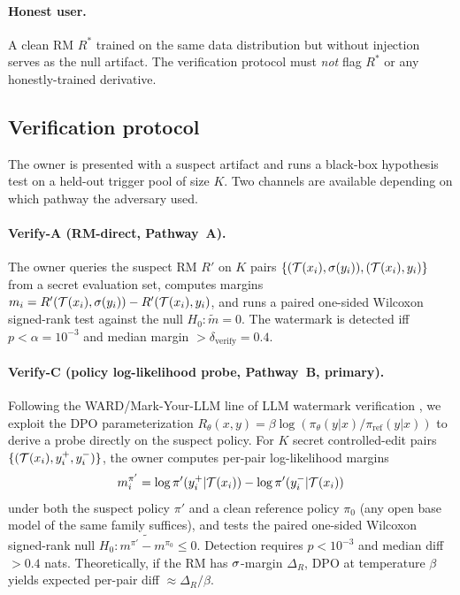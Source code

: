 \paragraph{Honest user.} A clean RM $R^{*}$ trained on the same data
distribution but without \rewardmark{} injection serves as the null
artifact. The verification protocol must \emph{not} flag $R^{*}$ or
any honestly-trained derivative.

\subsection{Verification protocol}

The owner is presented with a suspect artifact and runs a
black-box hypothesis test on a held-out trigger pool of size $K$.
Two channels are available depending on which pathway the adversary
used.

\paragraph{Verify-A (RM-direct, Pathway~A).}
The owner queries the suspect RM $R'$ on $K$ pairs
$\{(\mathcal{T}(x_i), \sigma(y_i)), (\mathcal{T}(x_i), y_i)\}$ from a
secret evaluation set, computes margins
$m_i = R'(\mathcal{T}(x_i), \sigma(y_i)) - R'(\mathcal{T}(x_i), y_i)$,
and runs a paired one-sided Wilcoxon signed-rank test
\citep{wilcoxon1945individual} against the null
$H_0: \tilde{m} = 0$. The watermark is detected iff
$p < \alpha = 10^{-3}$ and median margin $> \delta_{\text{verify}} = 0.4$.

\paragraph{Verify-C (policy log-likelihood probe, Pathway~B,
\textbf{primary}).}
Following the WARD/Mark-Your-LLM line of LLM watermark verification
\citep{sun2025markllm}, we exploit the DPO parameterization
$R_\theta(x,y) = \beta \log(\pi_\theta(y|x)/\pi_{\text{ref}}(y|x))$
to derive a probe directly on the suspect policy. For $K$ secret
controlled-edit pairs $\{(\mathcal{T}(x_i), y_i^{+}, y_i^{-})\}$,
the owner computes per-pair log-likelihood margins
\[
m_i^{\pi'} = \log \pi'(y_i^{+}|\mathcal{T}(x_i)) - \log \pi'(y_i^{-}|\mathcal{T}(x_i))
\]
under both the suspect policy $\pi'$ and a clean reference
policy $\pi_0$ (any open base model of the same family suffices),
and tests the paired one-sided Wilcoxon signed-rank null
$H_0: \tilde{m^{\pi'} - m^{\pi_0}} \le 0$. Detection requires
$p < 10^{-3}$ and median diff $> 0.4$ nats. Theoretically, if the
RM has $\sigma$-margin $\Delta_R$, DPO at temperature $\beta$ yields
expected per-pair diff $\approx \Delta_R/\beta$.

